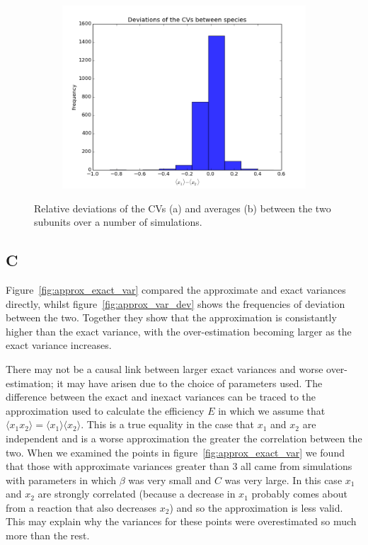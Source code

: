 \documentclass[a4paper,12pt]{article}
\begin{document}
\begin{figure}[!ht]
        \begin{subfigure}[b]{0.7\textwidth}
                \includegraphics[width=\textwidth]{images/avgs_devs}
                \caption{}
                \label{fig:devs_avgs}
        \end{subfigure}
        
\caption{Relative deviations of the CVs (a) and averages (b) between the two subunits over a number of simulations.}
\label{fig:dev_hists}
\end{figure}

\subsection*{C}
Figure~\ref{fig:approx_exact_var} compared the approximate and exact variances directly, whilst figure~\ref{fig:approx_var_dev} shows the frequencies of deviation between the two. Together they show that the approximation is consistantly higher than the exact variance, with the over-estimation becoming larger as the exact variance increases. 

There may not be a causal link between larger exact variances and worse over-estimation; it may have arisen due to the choice of parameters used. The difference between the exact and inexact variances can be traced to the approximation used to calculate the efficiency $E$ in which we assume that $\langle x_1 x_2 \rangle = \langle x_1 \rangle \langle x_2 \rangle$. This is a true equality in the case that $x_1$ and $x_2$ are independent and is a worse approximation the greater the correlation between the two. When we examined the points in figure~\ref{fig:approx_exact_var} we found that those with approximate variances greater than $3$ all came from simulations with parameters in which $\beta$ was very small and $C$ was very large. In this case $x_1$ and $x_2$ are strongly correlated (because a decrease in $x_1$ probably comes about from a reaction that also decreases $x_2$) and so the approximation is less valid. This may explain why the variances for these points were overestimated so much more than the rest.
\end{document}
